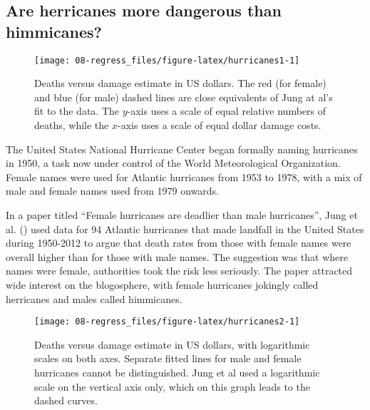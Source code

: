 \documentclass[
  10ptls,
  b5paper]{book}
\begin{document}
\subsection*{Are herricanes more dangerous than himmicanes?}\label{are-herricanes-more-dangerous-than-himmicanes}

\begin{figure}[H]

{\centering \texttt{[image: 08-regress\_files/figure-latex/hurricanes1-1]} 

}

\caption{Deaths versus damage estimate in US dollars. The red (for female) 
and blue (for male) dashed lines are close equivalents of Jung at al's fit
to the data. The $y$-axis uses a scale of equal relative numbers of deaths, 
while the $x$-axis uses a scale of equal dollar damage costs.}\label{fig:hurricanes1}
\end{figure}

The United States National Hurricane Center began formally naming hurricanes in 1950, a task now under control of the World Meteorological Organization. Female names were used for Atlantic hurricanes from 1953 to 1978, with a mix of male and female names used from 1979 onwards.

In a paper titled ``Female hurricanes are deadlier than male hurricanes'', Jung et al. () used data for 94 Atlantic hurricanes that made landfall in the United States during 1950-2012 to argue that death rates from those with female names were overall higher than for those with male names. The suggestion was that where names were female, authorities took the risk less seriously. The paper attracted wide interest on the blogosphere, with female hurricanes jokingly called herricanes and males called himmicanes.

\begin{figure}[H]

{\centering \texttt{[image: 08-regress\_files/figure-latex/hurricanes2-1]} 

}

\caption{Deaths versus damage estimate in US dollars, with logarithmic scales
               on both axes. Separate fitted lines for male and female
               hurricanes cannot be distinguished. Jung et al used a 
               logarithmic scale on the vertical axis only, which on
               this graph leads to the dashed curves.}\label{fig:hurricanes2}
\end{figure}
\end{document}

